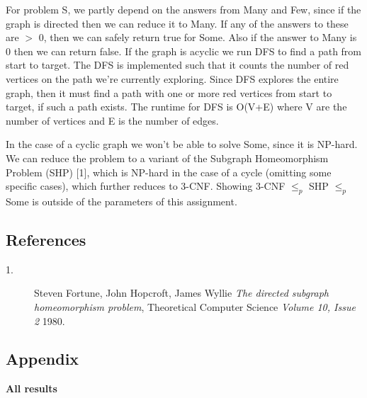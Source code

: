 \documentclass[a4paper]{article}
\begin{document}
For problem S, we partly depend on the answers from Many and Few, since if the graph is directed then we can reduce it to Many. If any of the answers to these are $>$ 0, then we can safely return true for Some. Also if the answer to Many is 0 then we can return false. If the graph is acyclic we run DFS to find a path from start to target. The DFS is implemented such that it counts the number of red vertices on the path we're currently exploring. Since DFS explores the entire graph, then it must find a path with one or more red vertices from start to target, if such a path exists. 
The runtime for DFS is O(V+E) where V are the number of vertices and E is the number of edges. 

In the case of a cyclic graph we won't be able to solve Some, since it is NP-hard. We can reduce the problem to a variant of the Subgraph Homeomorphism Problem (SHP) [1], which is NP-hard in the case of a cycle (omitting some specific cases), which further reduces to 3-CNF. Showing 3-CNF $\leq_p$ SHP $\leq_p$ Some is outside of the parameters of this assignment.

\subsection{References}
\begin{description}
  \item[1.] Steven Fortune, John Hopcroft, James Wyllie \emph{The directed subgraph homeomorphism problem}, Theoretical Computer Science \textit{Volume 10, Issue 2} 1980. 
\end{description}

\subsection{Appendix}
\textbf{All results}

\end{document}
